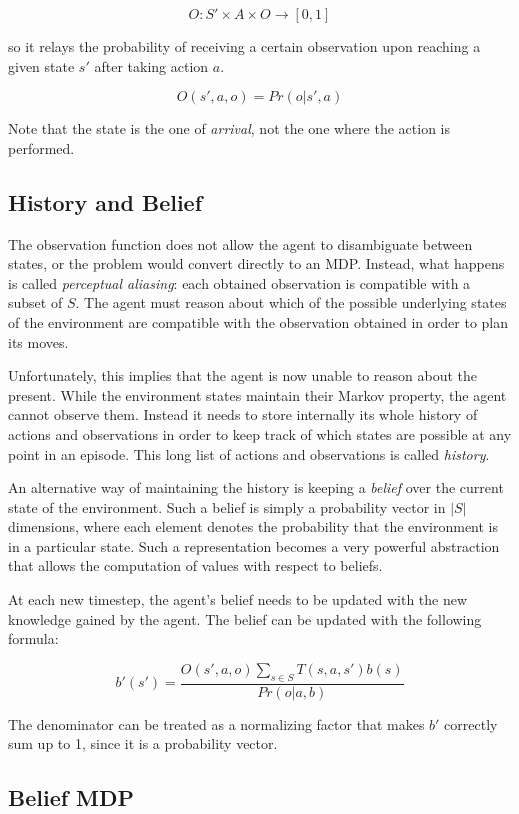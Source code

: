 \[ O : S' \times A \times O \rightarrow [0,1] \]

so it relays the probability of receiving a certain observation upon reaching a given state $s'$
after taking action $a$.

\[ O(s', a, o) = Pr(o | s', a) \]

Note that the state is the one of \textit{arrival}, not the one where the action is performed.

\subsection{History and Belief}

The observation function does not allow the agent to disambiguate between states, or the problem
would convert directly to an MDP. Instead, what happens is called \textit{perceptual aliasing}: each
obtained observation is compatible with a subset of $S$. The agent must reason about which of the
possible underlying states of the environment are compatible with the observation obtained in order
to plan its moves.

Unfortunately, this implies that the agent is now unable to reason about the present. While the
environment states maintain their Markov property, the agent cannot observe them. Instead it needs
to store internally its whole history of actions and observations in order to keep track of which
states are possible at any point in an episode. This long list of actions and observations is called
\textit{history}.

An alternative way of maintaining the history is keeping a \textit{belief} over the current state of
the environment. Such a belief is simply a probability vector in $|S|$ dimensions, where each
element denotes the probability that the environment is in a particular state. Such a representation
becomes a very powerful abstraction that allows the computation of values with respect to beliefs.

At each new timestep, the agent's belief needs to be updated with the new knowledge gained by the
agent. The belief can be updated with the following formula:

\[ b'(s') = \frac{O(s', a, o)\sum_{s\in S}T(s,a,s')b(s)}{Pr(o|a,b)} \]

The denominator can be treated as a normalizing factor that makes $b'$ correctly sum up to 1, since
it is a probability vector.

\subsection{Belief MDP}

